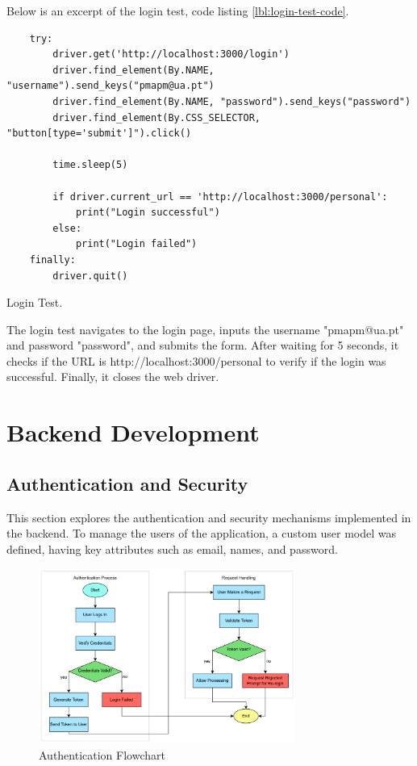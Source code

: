 Below is an excerpt of the login test, code listing \ref{lbl:login-test-code}.

\begin{listing}[h]
    \begin{verbatim}
    try:
        driver.get('http://localhost:3000/login') 
        driver.find_element(By.NAME, "username").send_keys("pmapm@ua.pt")
        driver.find_element(By.NAME, "password").send_keys("password")
        driver.find_element(By.CSS_SELECTOR, "button[type='submit']").click()

        time.sleep(5)

        if driver.current_url == 'http://localhost:3000/personal':
            print("Login successful")
        else:
            print("Login failed")
    finally:
        driver.quit()
    \end{verbatim}
    \caption{Login Test.}
    \label{lbl:login-test-code}
    \end{listing}

The login test navigates to the login page, inputs the 
username "pmapm@ua.pt" and 
password "password", and submits the form. After waiting for 5 seconds, it checks if the URL is 
http://localhost:3000/personal to verify if the login was successful. Finally, it closes the web driver.


\section{Backend Development}
\subsection{Authentication and Security}
This section explores the authentication and security mechanisms implemented in the backend. 
To manage the users of the application, a custom user model was defined, having key attributes such as email, 
names, and password. 

\begin{figure}[h]
    \centering 
    \includegraphics[width=0.75\textwidth]{figs/flow-chart.png} 
    \caption{Authentication Flowchart}
    \label{fig:auth-flowchart}
\end{figure}

